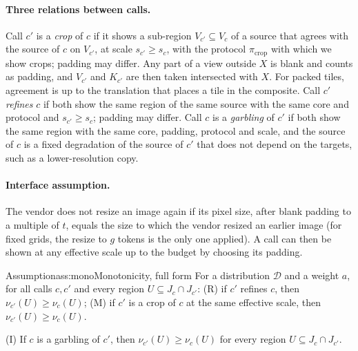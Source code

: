 \paragraph{Three relations between calls.} Call $c'$ is a \emph{crop} of $c$ if it shows a sub-region $V_{c'} \subseteq V_c$ of a source that agrees with the source of $c$ on $V_{c'}$, at scale $s_{c'} \ge s_c$, with the protocol $\pi_{\mathrm{crop}}$ with which we show crops; padding may differ. Any part of a view outside $X$ is blank and counts as padding, and $V_{c'}$ and $K_{c'}$ are then taken intersected with $X$. For packed tiles, agreement is up to the translation that places a tile in the composite. Call $c'$ \emph{refines} $c$ if both show the same region of the same source with the same core and protocol and $s_{c'} \ge s_c$; padding may differ. Call $c$ is a \emph{garbling} of $c'$ if both show the same region with the same core, padding, protocol and scale, and the source of $c$ is a fixed degradation of the source of $c'$ that does not depend on the targets, such as a lower-resolution copy.

\paragraph{Interface assumption.} The vendor does not resize an image again if its pixel size, after blank padding to a multiple of $t$, equals the size to which the vendor resized an earlier image (for fixed grids, the resize to $g$ tokens is the only one applied). A call can then be shown at any effective scale up to the budget by choosing its padding.

\begin{restatedef}{Assumption}{ass:mono}{Monotonicity, full form}
For a distribution $\mathcal{D}$ and a weight $a$, for all calls $c, c'$ and every region $U \subseteq J_c \cap J_{c'}$:
(R) if $c'$ refines $c$, then $\nu_{c'}(U) \ge \nu_c(U)$;
(M) if $c'$ is a crop of $c$ at the same effective scale, then $\nu_{c'}(U) \ge \nu_c(U)$.
\end{restatedef}

\begin{assumption}[Information]
\label{ass:info}
(I) If $c$ is a garbling of $c'$, then $\nu_{c'}(U) \ge \nu_c(U)$ for every region $U \subseteq J_c \cap J_{c'}$.
\end{assumption}

